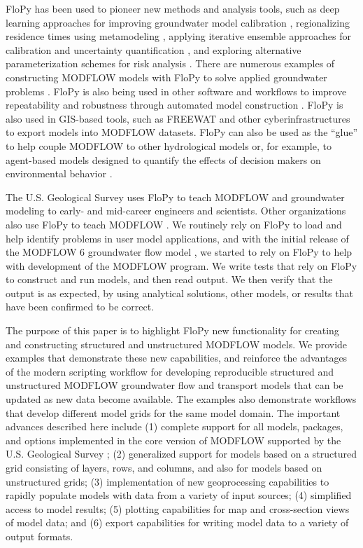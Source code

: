 \documentclass[12pt, oneside]{article}  	%
\begin{document}
FloPy has been used to pioneer new methods and analysis tools, such as deep learning approaches for improving groundwater model calibration \citep{sun2018, zhou2021}, regionalizing residence times using metamodeling \citep{starn2018}, applying iterative ensemble approaches for calibration and uncertainty quantification \citep{white2018ies}, and exploring alternative parameterization schemes for risk analysis \citep{knowling2019}. There are numerous examples of constructing MODFLOW models with FloPy to solve applied groundwater problems \citep{befus2017, vanengelen2018, ebeling2019, zipper2019, befus2020}. FloPy is also being used in other software and workflows to improve repeatability and robustness through automated model construction \citep{white2020toward, fienen2022risk, larsen2022rapid, leaf2022modflow}. FloPy is also used in GIS-based tools, such as FREEWAT \citep{freewat2018} and other cyberinfrastructures \citep{essawy2018} to export models into MODFLOW datasets. FloPy can also be used as the ``glue'' to help couple MODFLOW to other hydrological models \citep{burek2020} or, for example, to agent-based models designed to quantify the effects of decision makers on environmental behavior \citep{jaxarozen2019}. 

The U.S. Geological Survey uses FloPy to teach MODFLOW and groundwater modeling to early- and mid-career engineers and scientists. Other organizations also use FloPy to teach MODFLOW \citep[\textit{e.g.,}][]{auswat2023, hatari2023}. We routinely rely on FloPy to load and help identify problems in user model applications, and with the initial release of the MODFLOW 6 groundwater flow model \citep{modflow6gwf}, we started to rely on FloPy to help with development of the MODFLOW program. We write tests that rely on FloPy to construct and run models, and then read output. We then verify that the output is as expected, by using analytical solutions, other models, or results that have been confirmed to be correct.

The purpose of this paper is to highlight FloPy new functionality for creating and constructing structured and unstructured MODFLOW models. We provide examples that demonstrate these new capabilities, and reinforce the advantages of the modern scripting workflow for developing reproducible structured and unstructured MODFLOW groundwater flow and transport models that can be updated as new data become available. The examples also demonstrate workflows that develop different model grids for the same model domain. The important advances described here include (1) complete support for all models, packages, and options implemented in the core version of MODFLOW supported by the U.S. Geological Survey \citep{modflow6framework, modflow6gwf, modflow6xt3d, langevin2020hydraulic, morway2021use, modflow6gwt, modflow6csub, modflow6lkt}; (2) generalized support for models based on a structured grid consisting of layers, rows, and columns, and also for models based on unstructured grids; (3) implementation of new geoprocessing capabilities to rapidly populate models with data from a variety of input sources; (4) simplified access to model results; (5) plotting capabilities for map and cross-section views of model data; and (6) export capabilities for writing model data to a variety of output formats.
\end{document}
